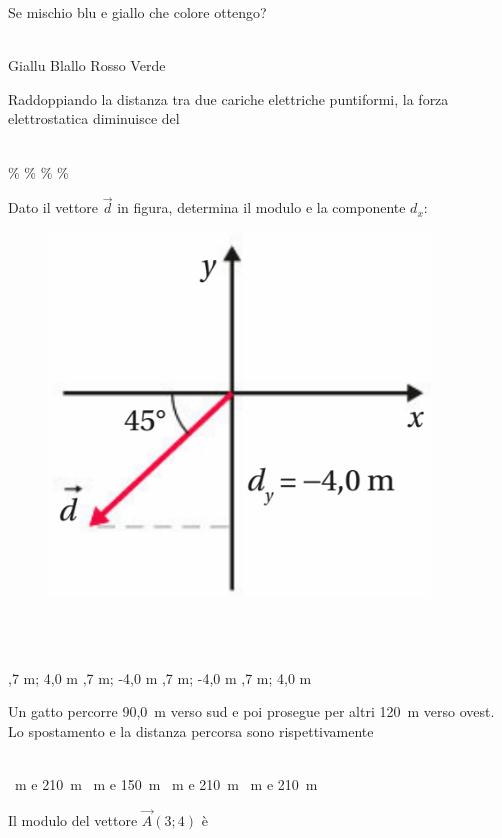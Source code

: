 \documentclass[a4paper,11pt]{exam}
\begin{document}
\begin{questions}
    
\question Se mischio blu e giallo che colore ottengo?\\\
\begin{oneparchoices}
  \choice Giallu
  \choice Blallo
  \choice Rosso
  \choice Verde
\end{oneparchoices}

    
\question Raddoppiando la distanza tra due cariche elettriche puntiformi, la forza elettrostatica diminuisce del\\\
\begin{oneparchoices}
  \choice 25\%
  \%
  \%
  \%
\end{oneparchoices}

    
\question Dato il vettore $\vec{d}$ in figura, determina il modulo e la componente $d_x$: \begin{figure}[h!]   \begin{center}     \includegraphics[scale=0.35]{vettored.png}   \end{center} \end{figure}\\\
\begin{oneparchoices}
  ,7 m; 4,0 m
  ,7 m; -4,0 m
  \choice -5,7 m; -4,0 m
  \choice 5,7 m; 4,0 m
\end{oneparchoices}

    
\question Un gatto percorre 90,0~m verso sud e poi prosegue per altri 120~m verso ovest. Lo spostamento e la distanza percorsa sono rispettivamente\\\
\begin{oneparchoices}
  ~m e 210~m
  ~m e 150~m
  \choice 150~m e 210~m
  \choice 30~m e 210~m
\end{oneparchoices}

    
\question Il modulo del vettore $\vec{A}(3;4)$ è\\\
\begin{oneparchoices}
  \choice 8
  \choice 12
\end{oneparchoices}

    
\end{questions}
\end{document}
